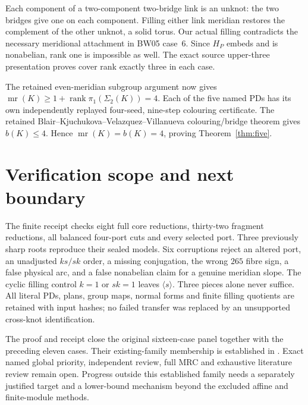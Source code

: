 \documentclass[11pt]{article}
\newcommand{\rank}{\operatorname{rank}}
\newcommand{\mr}{\operatorname{mr}}
\begin{document}
Each component of a two-component two-bridge link is an unknot: the two
bridges give one on each component. Filling either link meridian
restores the complement of the other unknot, a solid torus. Our actual
filling contradicts the necessary meridional attachment in BW05 case~6.
Since $H_P$ embeds and is nonabelian, rank one is impossible as well.
The exact source upper-three presentation proves cover rank exactly
three in each case.

The retained even-meridian subgroup argument now gives
$\mr(K)\ge1+\rank\pi_1(\Sigma_2(K))=4$.
Each of the five named PDs has its own independently replayed four-seed,
nine-step colouring certificate. The retained
Blair--Kjuchukova--Velazquez--Villanueva colouring/bridge theorem gives
$b(K)\le4$. Hence $\mr(K)=b(K)=4$, proving Theorem~\ref{thm:five}.

\section{Verification scope and next boundary}

The finite receipt checks eight full core reductions, thirty-two fragment
reductions, all balanced four-port cuts and every selected port. Three
previously sharp roots reproduce their sealed models. Six corruptions
reject an altered port, an unadjusted $ks/sk$ order, a missing conjugation,
the wrong $265$ fibre sign, a false physical arc, and a false nonabelian
claim for a genuine meridian slope. The cyclic filling control $k=1$ or
$sk=1$ leaves $\langle s\rangle$. Three pieces alone never suffice.
All literal PDs, plans, group maps, normal forms and finite filling
quotients are retained with input hashes; no failed transfer was replaced
by an unsupported cross-knot identification.

The proof and receipt close the original sixteen-case panel together
with the preceding eleven cases. Their existing-family membership is
established in .
Exact named global priority, independent review, full MRC and exhaustive
literature review remain open. Progress outside this established family
needs a separately justified target and a lower-bound mechanism beyond
the excluded affine and finite-module methods.
\end{document}
